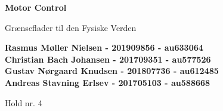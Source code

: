 \documentclass{article}
\begin{document}

\begin{titlepage}
    
    \begin{center}
        \vspace*{1cm}
 
        \Huge
        \textbf{Motor Control}
 
        \vspace{0.5cm}
        \LARGE
        Grænseflader til den Fysiske Verden \\
        \date\today
 
        \vspace{1.5cm}
 
        \textbf{
        Rasmus Møller Nielsen - 201909856 - au633064 \\
	   Christian Bach Johansen - 201709351 - au577526\\
	   Gustav Nørgaard Knudsen - 201807736 - au612485\\
	   Andreas Stavning Erlsev - 201705103 - au588668}
        
        \vfill
        \vspace{2cm}
 
        Hold nr. 4
 
    \end{center}
\end{titlepage}

\newpage
\newpage

\setcounter{page}{1}

\end{document}
